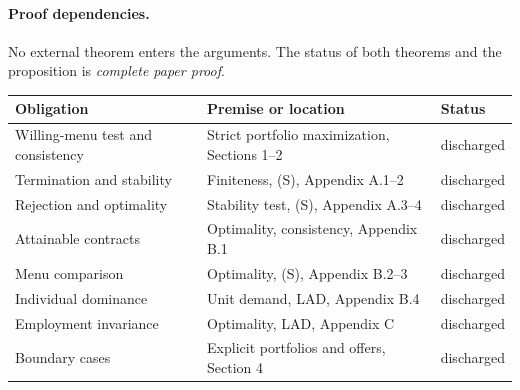 \documentclass[11pt]{article}
\begin{document}
\paragraph{Proof dependencies.}
No external theorem enters the arguments. The status of both theorems and the proposition is \emph{complete paper proof}.
\begin{center}
\begin{tabular}{lll}
\toprule
Obligation & Premise or location & Status\\
\midrule
Willing-menu test and consistency & Strict portfolio maximization, Sections 1--2 & discharged\\
Termination and stability & Finiteness, (S), Appendix A.1--2 & discharged\\
Rejection and optimality & Stability test, (S), Appendix A.3--4 & discharged\\
Attainable contracts & Optimality, consistency, Appendix B.1 & discharged\\
Menu comparison & Optimality, (S), Appendix B.2--3 & discharged\\
Individual dominance & Unit demand, LAD, Appendix B.4 & discharged\\
Employment invariance & Optimality, LAD, Appendix C & discharged\\
Boundary cases & Explicit portfolios and offers, Section 4 & discharged\\
\bottomrule
\end{tabular}
\end{center}
\end{document}
